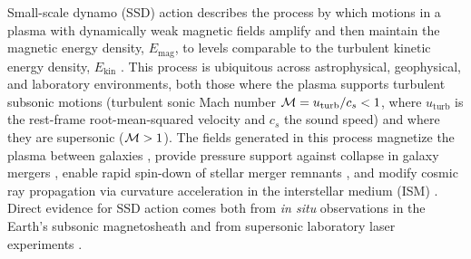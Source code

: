     Small-scale dynamo (SSD) action describes the process by which motions in a plasma with dynamically weak magnetic fields amplify and then maintain the magnetic energy density, $E_\mathrm{mag}$, to levels comparable to the turbulent kinetic energy density, $E_\mathrm{kin}$ \citep{brandenburg2012current, rincon2019dynamo, rempel2023small}. This process is ubiquitous across astrophysical, geophysical, and laboratory environments, both those where the plasma supports turbulent subsonic motions (turbulent sonic Mach number $\mathcal{M} = u_\mathrm{turb}/c_s < 1$, where $u_\mathrm{turb}$ is the rest-frame root-mean-squared velocity and $c_s$ the sound speed) and where they are supersonic ($\mathcal{M} > 1$). The fields generated in this process magnetize the plasma between galaxies \citep{Roh2019_galaxy_clusters, tevlin2025magnetic}, provide pressure support against collapse in galaxy mergers \citep{whittingham2021impact}, enable rapid spin-down of stellar merger remnants \citep{palenzuela2022turbulent, ryu2025magnetic}, and modify cosmic ray propagation via curvature acceleration in the interstellar medium (ISM) \citep{kempski2023cosmic, Lemoine2023_field_reversal_CR_transport}. Direct evidence for SSD action comes both from \textit{in situ} observations in the Earth's subsonic magnetosheath \citep{voros2025turbulent} and from supersonic laboratory laser experiments \citep{Meinecke2014_SSD_lab_Nature, tzeferacos2018laboratory, Bott2021_supersonic_dynamo_in_lab, Bott2021_time_resolved_lab_dynamo}.

